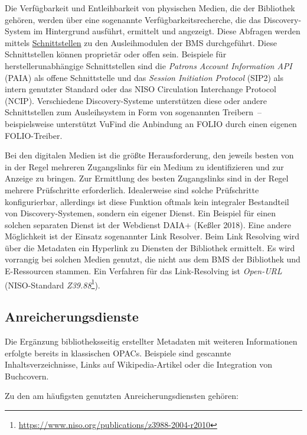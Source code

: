 \documentclass[
  11pt,
  letterpaper,
  DIV=11,
  twoside]{scrreprt}
\DeclareRobustCommand{\href}[2]{#2\footnote{\url{#1}}}
\begin{document}
Die Verfügbarkeit und Entleihbarkeit von physischen Medien, die der
Bibliothek gehören, werden über eine sogenannte Verfügbarkeitsrecherche,
die das Discovery-System im Hintergrund ausführt, ermittelt und
angezeigt. Diese Abfragen werden mittels
\hyperref[schnittstellen]{Schnittstellen} zu den Ausleihmodulen der BMS
durchgeführt. Diese Schnittstellen können proprietär oder offen sein.
Beispiele für herstellerunabhängige Schnittstellen sind die
\emph{Patrons Account Information API} (PAIA) als offene Schnittstelle
und das \emph{Session Initiation Protocol} (SIP2) als intern genutzter
Standard oder das NISO Circulation Interchange Protocol ({NCIP}).
Verschiedene Discovery-Systeme unterstützen diese oder andere
Schnittstellen zum Ausleihsystem in Form von sogenannten Treibern~--
beispielsweise unterstützt VuFind die Anbindung an FOLIO durch einen
eigenen FOLIO-Treiber.

Bei den digitalen Medien ist die größte Herausforderung, den jeweils
besten von in der Regel mehreren Zugangslinks für ein Medium zu
identifizieren und zur Anzeige zu bringen. Zur Ermittlung des besten
Zugangslinks sind in der Regel mehrere Prüfschritte erforderlich.
Idealerweise sind solche Prüfschritte konfigurierbar, allerdings ist
diese Funktion oftmals kein integraler Bestandteil von
Discovery-Systemen, sondern ein eigener Dienst. Ein Beispiel für einen
solchen separaten Dienst ist der Webdienst DAIA+ (Keßler 2018). Eine
andere Möglichkeit ist der Einsatz sogenannter Link Resolver. Beim Link
Resolving wird über die Metadaten ein Hyperlink zu Diensten der
Bibliothek ermittelt. Es wird vorrangig bei solchen Medien genutzt, die
nicht aus dem BMS der Bibliothek und E-Ressourcen stammen. Ein Verfahren
für das Link-Resolving ist \emph{Open-URL} (NISO-Standard
\href{https://www.niso.org/publications/z3988-2004-r2010}{\emph{Z39.88}}).

\subsection{Anreicherungsdienste}\label{anreicherungsdienste}

Die Ergänzung bibliotheksseitig erstellter Metadaten mit weiteren
Informationen erfolgte bereits in klassischen OPACs. Beispiele sind
gescannte Inhaltsverzeichnisse, Links auf Wikipedia-Artikel oder die
Integration von Buchcovern.

Zu den am häufigsten genutzten Anreicherungsdiensten gehören:
\end{document}
